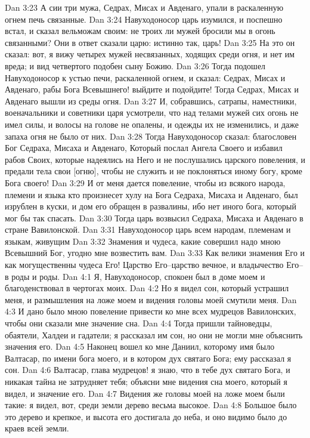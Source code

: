 Dan 3:23  А сии три мужа, Седрах, Мисах и Авденаго, упали в раскаленную огнем печь связанные.
Dan 3:24  Навуходоносор царь изумился, и поспешно встал, и сказал вельможам своим: не троих ли мужей бросили мы в огонь связанными? Они в ответ сказали царю: истинно так, царь!
Dan 3:25  На это он сказал: вот, я вижу четырех мужей несвязанных, ходящих среди огня, и нет им вреда; и вид четвертого подобен сыну Божию.
Dan 3:26  Тогда подошел Навуходоносор к устью печи, раскаленной огнем, и сказал: Седрах, Мисах и Авденаго, рабы Бога Всевышнего! выйдите и подойдите! Тогда Седрах, Мисах и Авденаго вышли из среды огня.
Dan 3:27  И, собравшись, сатрапы, наместники, военачальники и советники царя усмотрели, что над телами мужей сих огонь не имел силы, и волосы на голове не опалены, и одежды их не изменились, и даже запаха огня не было от них.
Dan 3:28  Тогда Навуходоносор сказал: благословен Бог Седраха, Мисаха и Авденаго,  Который послал Ангела Своего  и избавил рабов Своих,  которые надеялись на Него и не послушались царского повеления, и предали тела свои [огню], чтобы не служить и не поклоняться иному богу, кроме Бога своего!
Dan 3:29  И от меня дается повеление, чтобы из всякого народа, племени и языка кто произнесет хулу на Бога Седраха, Мисаха и Авденаго, был изрублен в куски, и дом его обращен в развалины, ибо нет иного бога, который мог бы так спасать.
Dan 3:30  Тогда царь возвысил Седраха, Мисаха и Авденаго в стране Вавилонской.
Dan 3:31  Навуходоносор царь всем народам, племенам и языкам, живущим
Dan 3:32  Знамения и чудеса, какие совершил надо мною Всевышний Бог, угодно мне возвестить вам.
Dan 3:33  Как велики знамения Его и как могущественны чудеса Его! Царство Его--царство вечное, и владычество Его--в роды и роды.
Dan 4:1  Я, Навуходоносор, спокоен был в доме моем и благоденствовал в чертогах моих.
Dan 4:2  Но я видел сон, который устрашил меня, и размышления на ложе моем и видения головы моей смутили меня.
Dan 4:3  И дано было мною повеление привести ко мне всех мудрецов Вавилонских, чтобы они сказали мне значение сна.
Dan 4:4  Тогда пришли тайноведцы, обаятели, Халдеи и гадатели; я рассказал им сон, но они не могли мне объяснить значения его.
Dan 4:5  Наконец вошел ко мне Даниил, которому имя было Валтасар, по имени бога моего, и в котором дух святаго Бога; ему рассказал я сон.
Dan 4:6  Валтасар, глава мудрецов! я знаю, что в тебе дух святаго Бога, и никакая тайна не затрудняет тебя; объясни мне видения сна моего, который я видел, и значение его.
Dan 4:7  Видения же головы моей на ложе моем были такие: я видел, вот, среди земли дерево весьма высокое.
Dan 4:8  Большое было это дерево и крепкое, и высота его достигала до неба, и оно видимо было до краев всей земли.
